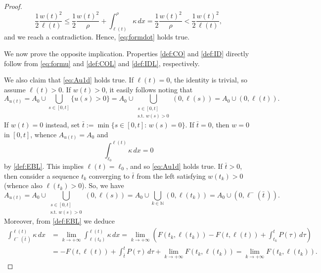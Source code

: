 \documentclass[a4paper,11pt,reqno]{amsart}
\numberwithin{equation}{section}
\theoremstyle{definition}
\theoremstyle{remark}
\newcommand{\n}{\mathbb{N}}
\begin{document}
\begin{proof}
        \begin{equation}
            \frac 12 \frac{w(t)^2}{\ell(t)}\le \frac 12 \frac{w(t)^2}{\rho}+\int_{\ell(t)}^\rho \kappa\, dx=\frac 12 \frac{w(t)^2}{\rho}<\frac 12 \frac{w(t)^2}{\ell(t)},
        \end{equation}
        and we reach a contradiction. Hence, \eqref{eq:formdot} holds true.

        We now prove the opposite implication. Properties \ref{def:CO} and \ref{def:ID} directly follow from \eqref{eq:formu} and \ref{def:COL} and \ref{def:IDL}, respectively. 
        
        We also claim that \eqref{eq:Au1d} holds true. If $\ell(t)=0$, the identity is trivial, so assume $\ell(t)>0$. If $w(t)>0$, it easily follows noting that
        \begin{equation}
            A_{u(t)}=A_0\cup\bigcup_{s\in [0,t]}\{u(s)>0\}=A_0\cup\bigcup_{\substack{{s\in [0,t]}\\{\text{s.t. } w(s)>0}}}(0,\ell(s))=A_0\cup (0,\ell(t)).
        \end{equation}
        If $w(t)=0$ instead, set $\bar t:=\min\{s\in [0,t]:\, w(s)=0\}$. If $\bar t=0$, then $w=0$ in $[0,t]$, whence $A_{u(t)}=A_0$ and
        \begin{equation}
            \int_{\ell_0}^{\ell(t)}\kappa \, dx=0
        \end{equation}
        by \ref{def:EBL}. This implies $\ell(t)=\ell_0$, and so \eqref{eq:Au1d} holds true. If $\bar t>0$, then consider a sequence $t_k$ converging to $\bar t$ from the left satisfying $w(t_k)>0$ (whence also $\ell(t_k)>0$). 
        So, we have
        \begin{equation}
            A_{u(t)}=A_0\cup\bigcup_{\substack{{s\in [0,t]}\\{\text{s.t. } w(s)>0}}}(0,\ell(s))=A_0\cup\bigcup_{k\in \n}(0,\ell(t_k))=A_0\cup (0,\ell^-(\bar t\,)).
        \end{equation}
        Moreover, from \ref{def:EBL} we deduce
        \begin{align}
            \int_{\ell^-(\bar t\,)}^{\ell(t)}\kappa\, dx&=\lim\limits_{k\to +\infty}\int_{\ell(t_k)}^{\ell(t)}\kappa\, dx=\lim\limits_{k\to +\infty}\left( F(t_k,\ell(t_k))- F(t,\ell(t))+\int_{t_k}^t P(\tau)\, d\tau\right)\\
            &=- F(t,\ell(t))+\int_{\bar t}^t P(\tau)\, d\tau+\lim\limits_{k\to +\infty} F(t_k,\ell(t_k))=\lim\limits_{k\to +\infty} F(t_k,\ell(t_k)).
        \end{align}

\end{proof}
\end{document}
